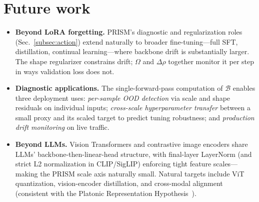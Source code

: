 
\section{Future work}
\label{app:future_work}

\begin{itemize}[leftmargin=*]
    \item \textbf{Beyond LoRA forgetting.} PRISM's diagnostic and regularization roles (Sec.~\ref{subsec:action}) extend naturally to broader fine-tuning---full SFT, distillation, continual learning---where backbone drift is substantially larger. The shape regularizer constrains drift; $\Omega$ and $\Delta\rho$ together monitor it per step in ways validation loss does not.
    \item \textbf{Diagnostic applications.} The single-forward-pass computation of $\mathcal{B}$ enables three deployment uses: \emph{per-sample OOD detection} via scale and shape residuals on individual inputs; \emph{cross-scale hyperparameter transfer} between a small proxy and its scaled target to predict tuning robustness; and \emph{production drift monitoring} on live traffic.
    \item \textbf{Beyond LLMs.} Vision Transformers and contrastive image encoders share LLMs' backbone-then-linear-head structure, with final-layer LayerNorm (and strict L2 normalization in CLIP/SigLIP) enforcing tight feature scales---making the PRISM scale axis naturally small. Natural targets include ViT quantization, vision-encoder distillation, and cross-modal alignment (consistent with the Platonic Representation Hypothesis~\citep{huh2024platonic}).
\end{itemize}
